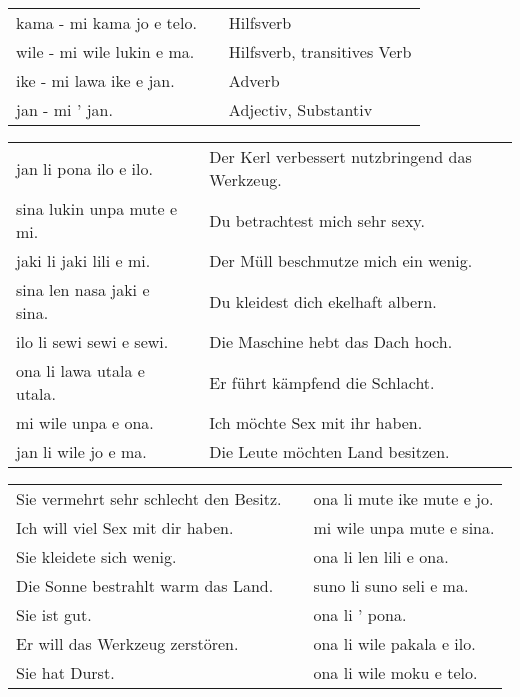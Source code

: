 \begin{supertabular}{p{5,5cm}|ll}
kama - mi kama jo e telo. && Hilfsverb \\ %
wile - mi wile lukin e ma. && Hilfsverb, transitives Verb \\ %
ike - mi lawa ike e jan. && Adverb \\ %
jan - mi ' jan.  && Adjectiv, Substantiv \\ %
\end{supertabular} 


\begin{supertabular}{p{5,5cm}|ll}
jan li pona ilo e ilo. && Der Kerl verbessert nutzbringend das Werkzeug. \\ %
sina lukin unpa mute e mi. && Du betrachtest mich sehr sexy.  \\ %
jaki li jaki lili e mi. && Der Müll beschmutze mich ein wenig. \\ %
sina len nasa jaki e sina. && Du kleidest dich ekelhaft albern. \\ %
ilo li sewi sewi e sewi. && Die Maschine hebt das Dach hoch. \\ %
ona li lawa utala e utala. && Er führt kämpfend die Schlacht. \\ %
mi wile unpa e ona. && Ich möchte Sex mit ihr haben.  \\ %
jan li wile jo e ma. && Die Leute möchten Land besitzen. \\ %
\end{supertabular}  

\begin{supertabular}{p{5,5cm}|ll}
Sie vermehrt sehr schlecht den Besitz. && ona li mute ike mute e jo. \\
Ich will viel Sex mit dir haben. && mi wile unpa mute e sina. \\
Sie kleidete sich wenig. && ona li len lili e ona. \\
Die Sonne bestrahlt warm das Land. && suno li suno seli e ma. \\
Sie ist gut. && ona li ' pona. \\
Er will das Werkzeug zerstören. && ona li wile pakala e ilo. \\ %
Sie hat Durst. && ona li wile moku e telo. \\ %
\end{supertabular} 

